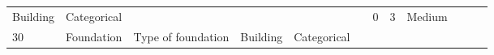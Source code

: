 \documentclass[11pt]{article}
\begin{document}
\begin{longtable}[]{@{}llllllllllll@{}}
\begin{minipage}[t]{0.04\columnwidth}
Building\strut
\end{minipage} & \begin{minipage}[t]{0.04\columnwidth}\raggedright\strut
Categorical\strut
\end{minipage} & \begin{minipage}[t]{0.04\columnwidth}\raggedright\strut
\strut
\end{minipage} & \begin{minipage}[t]{0.04\columnwidth}\raggedright\strut
\strut
\end{minipage} & \begin{minipage}[t]{0.04\columnwidth}\raggedright\strut
\strut
\end{minipage} & \begin{minipage}[t]{0.04\columnwidth}\raggedright\strut
\strut
\end{minipage} & \begin{minipage}[t]{0.04\columnwidth}\raggedright\strut
0\strut
\end{minipage} & \begin{minipage}[t]{0.04\columnwidth}\raggedright\strut
3\strut
\end{minipage} & \begin{minipage}[t]{0.04\columnwidth}\raggedright\strut
Medium\strut
\end{minipage}\tabularnewline
\begin{minipage}[t]{0.04\columnwidth}\raggedright\strut
30\strut
\end{minipage} & \begin{minipage}[t]{0.04\columnwidth}\raggedright\strut
Foundation\strut
\end{minipage} & \begin{minipage}[t]{0.04\columnwidth}\raggedright\strut
Type of foundation\strut
\end{minipage} & \begin{minipage}[t]{0.04\columnwidth}\raggedright\strut
Building\strut
\end{minipage} & \begin{minipage}[t]{0.04\columnwidth}\raggedright\strut
Categorical\strut
\end{minipage} & \begin{minipage}[t]{0.04\columnwidth}\raggedright\strut
\strut
\end{minipage} & \begin{minipage}[t]{0.04\columnwidth}\raggedright\strut
\strut
\end{minipage} & \begin{minipage}[t]{0.04\columnwidth}\raggedright\strut

\end{minipage}
\end{longtable}
\end{document}
